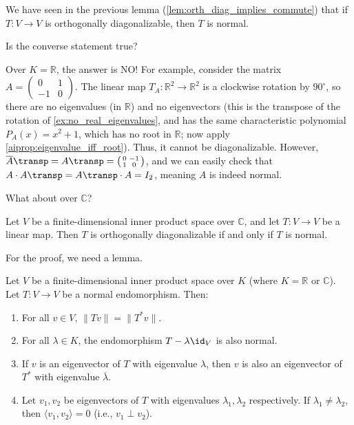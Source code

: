 We have seen in the previous lemma (\cref{lem:orth_diag_implies_commute}) that if $T \colon V \to V$ is orthogonally diagonalizable, then $T$ is normal. 

\begin{question}
Is the converse statement true?
\end{question}

Over $K = \mathbb{R}$, the answer is NO! 
For example, consider the matrix $A = \left(\begin{smallmatrix} 0 & 1 \\ -1 & 0 \end{smallmatrix}\right)$. The linear map $T_A \colon \mathbb{R}^2 \to \mathbb{R}^2$ is a clockwise rotation by $90^\circ$, so there are no eigenvalues (in $\mathbb{R}$) and no eigenvectors (this is the transpose of the rotation of \cref{ex:no_real_eigenvalues}, and has the same characteristic polynomial $P_A(x) = x^2 + 1$, which has no root in $\mathbb{R}$; now apply \cref{aiprop:eigenvalue_iff_root}). Thus, it cannot be diagonalizable.
However, $\overline{A}\transp = A\transp = \left(\begin{smallmatrix} 0 & -1 \\ 1 & 0 \end{smallmatrix}\right)$, and we can easily check that $A \cdot A\transp = A\transp \cdot A = I_2$, meaning $A$ is indeed normal.

What about over $\mathbb{C}$?

\begin{theorem}
\label{thm:spectral_thm_c}
Let $V$ be a finite-di\-men\-sional inner product space over $\mathbb{C}$, and let $T \colon V \to V$ be a linear map. Then $T$ is orthogonally diagonalizable if and only if $T$ is normal.
\end{theorem}

For the proof, we need a lemma.

\begin{lemma}
\label{lem:properties_normal_endo}
Let $V$ be a finite-di\-men\-sional inner product space over $K$ (where $K = \mathbb{R}$ or $\mathbb{C}$). Let $T \colon V \to V$ be a normal endomorphism. Then:
\begin{enumerate}[label=\textbf{(\alph*)}]
    \item For all $v \in V$, $\|Tv\| = \|T^*v\|$.
    \item For all $\lambda \in K$, the endomorphism $T - \lambda \id_V$ is also normal.
    \item If $v$ is an eigenvector of $T$ with eigenvalue $\lambda$, then $v$ is also an eigenvector of $T^*$ with eigenvalue $\overline{\lambda}$.
    \item Let $v_1, v_2$ be eigenvectors of $T$ with eigenvalues $\lambda_1, \lambda_2$ respectively. If $\lambda_1 \neq \lambda_2$, then $\langle v_1, v_2 \rangle = 0$ (i.e., $v_1 \perp v_2$).
\end{enumerate}
\end{lemma}

